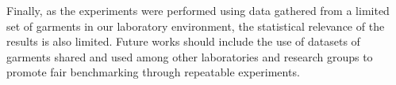 Finally, as the experiments were performed using data gathered from a limited set of garments in our laboratory environment, the statistical relevance of the results is also limited. Future works should include the use of datasets of garments shared and used among other laboratories and research groups to promote fair benchmarking through repeatable experiments.
